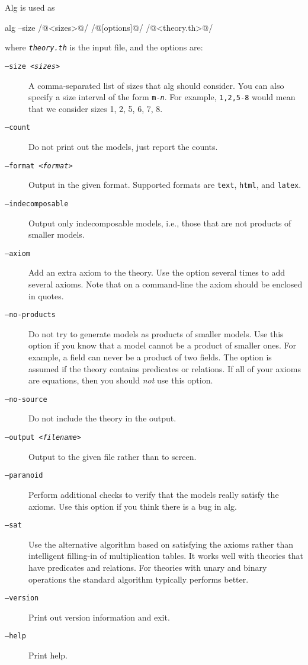 \documentclass{article}
\begin{document}
Alg is used as
%
\begin{shell}
alg --size /@<sizes>@/ /@[options]@/ /@<theory.th>@/
\end{shell}
%
where \texttt{\textit{theory.th}} is the input file, and the options are:
%
\begin{description}
\item[\texttt{--size \textit{<sizes>}}]
  A comma-separated list of sizes that alg should consider. You can
  also specify a size interval of the form
  \texttt{\texttt{m}-\textit{n}}. For example, \texttt{1,2,5-8} would
  mean that we consider sizes 1, 2, 5, 6, 7, 8.
\item[\texttt{--count}]
  Do not print out the models, just report the counts.
\item[\texttt{--format \textit{<format>}}]
  Output in the given format. Supported formats are \texttt{text},
  \texttt{html}, and \texttt{latex}.
\item[\texttt{--indecomposable}]
  Output only indecomposable models, i.e., those that are not products
  of smaller models.
\item[\texttt{--axiom}]
  Add an extra axiom to the theory. Use the option several times to
  add several axioms. Note that on a command-line the axiom
  should be enclosed in quotes.
\item[\texttt{--no-products}] Do not try to generate models as
  products of smaller models. Use this option if you know that a model
  cannot be a product of smaller ones. For example, a field can never
  be a product of two fields. The option is assumed if the theory
  contains predicates or relations. If all of your axioms are
  equations, then you should \emph{not} use this option.
\item[\texttt{--no-source}]
  Do not include the theory in the output.
\item[\texttt{--output \textit{<filename>}}]
  Output to the given file rather than to screen.
\item[\texttt{--paranoid}]
  Perform additional checks to verify that the models really satisfy
  the axioms. Use this option if you think there is a bug in alg.
\item[\texttt{--sat}]
  Use the alternative algorithm based on satisfying the axioms rather
  than intelligent filling-in of multiplication tables. It works well
  with theories that have predicates and relations. For theories with
  unary and binary operations the standard algorithm typically
  performs better.
\item[\texttt{--version}]
  Print out version information and exit.
\item[\texttt{--help}]
  Print help.
\end{description}
\end{document}
